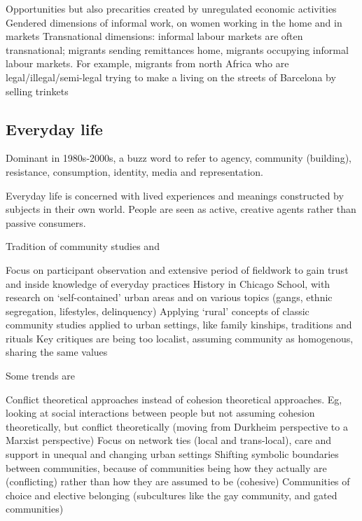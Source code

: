 \documentclass{article}
\begin{document}
\begin{outline}
	\1 Opportunities but also precarities created by unregulated economic activities
	\1 Gendered dimensions of informal work, on women working in the home and in markets
	\1 Transnational dimensions: informal labour markets are often transnational; migrants sending remittances home, migrants occupying informal labour markets. For example, migrants from north Africa who are legal/illegal/semi-legal trying to make a living on the streets of Barcelona by selling trinkets
\end{outline}

\subsection{Everyday life}

Dominant in 1980s-2000s, a buzz word to refer to agency, community (building), resistance, consumption, identity, media and representation.

Everyday life is concerned with lived experiences and meanings constructed by subjects in their own world. 
People are seen as active, creative agents rather than passive consumers.

Tradition of community studies and
\begin{outline}
	\1 Focus on participant observation and extensive period of fieldwork to gain trust and inside knowledge of everyday practices
	\1 History in Chicago School, with research on `self-contained' urban areas and on various topics (gangs, ethnic segregation, lifestyles, delinquency)
	\1 Applying `rural' concepts of classic community studies applied to urban settings, like family kinships, traditions and rituals
	\1 Key critiques are being too localist, assuming community as homogenous, sharing the same values
\end{outline}

Some trends are

\begin{outline}
	\1 Conflict theoretical approaches instead of cohesion theoretical approaches. Eg, looking at social interactions between people but not assuming cohesion theoretically, but conflict theoretically (moving from Durkheim perspective to a Marxist perspective)
	\1 Focus on network ties (local and trans-local), care and support in unequal and changing urban settings
	\1 Shifting symbolic boundaries between communities, because of communities being how they actually are (conflicting) rather than how they are assumed to be (cohesive)
	\1 Communities of choice and elective belonging (subcultures like the gay community, and gated communities)
\end{outline}
\end{document}
